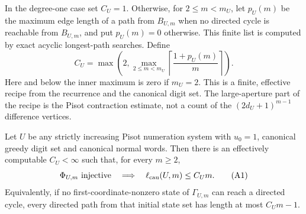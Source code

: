 In the degree-one case set $C_U=1$.  Otherwise, for $2\le m<m_U$, let
$p_U(m)$ be the maximum edge length of a path from $B_{U,m}$ when no directed
cycle is reachable from $B_{U,m}$, and put $p_U(m)=0$ otherwise.  This finite
list is computed by exact acyclic longest-path searches.  Define
\begin{equation}
C_U=\max\left(2,
 \max_{2\le m<m_U}\left\lceil\frac{1+p_U(m)}m\right\rceil\right).
\label{eq:effective-linear-constant}
\end{equation}
Here and below the inner maximum is zero if $m_U=2$.
This is a finite, effective recipe from the recurrence and the canonical
digit set.  The large-aperture part
of the recipe is the Pisot contraction estimate, not a count of the
$(2d_U+1)^{m-1}$ difference vertices.

\begin{theorem}
\label{thm:pisot-linear-depth-sharpness}
Let $U$ be any strictly increasing Pisot numeration system with $u_0=1$,
canonical greedy digit set and canonical normal words.  Then there is an
effectively computable $C_U<\infty$ such that, for every $m\ge2$,
\begin{equation*}
\Phi_{U,m}\text{ injective}
\quad\Longrightarrow\quad
\ell_{\rm cau}(U,m)\le C_Um.
\tag{A1}\label{eq:pisot-linear-A1}
\end{equation*}
Equivalently, if no first-coordinate-nonzero state of $\Gamma_{U,m}$ can
reach a directed cycle, every directed path from that initial state set has
length at most $C_Um-1$.


\end{theorem}
